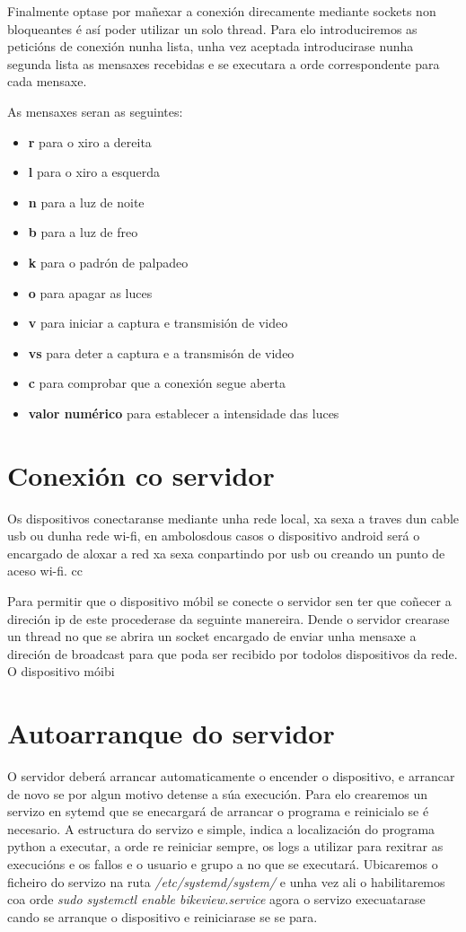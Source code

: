  Finalmente optase por mañexar a conexión direcamente mediante sockets non bloqueantes é así poder utilizar un solo thread. Para elo introduciremos as peticións de conexión nunha lista, unha vez aceptada introducirase nunha segunda lista as mensaxes recebidas e se executara a orde correspondente para cada mensaxe.

As mensaxes seran as seguintes:
\begin{itemize}
    \item \textbf{r} para o xiro a dereita
    \item \textbf{l} para o xiro a esquerda
    \item \textbf{n} para a luz de noite
    \item \textbf{b} para a luz de freo
    \item \textbf{k} para o padrón de palpadeo
    \item \textbf{o} para apagar as luces
    \item \textbf{v} para iniciar a captura e transmisión de video
    \item \textbf{vs} para deter a captura e a transmisón de video
    \item \textbf{c} para comprobar que a conexión segue aberta
    \item \textbf{valor numérico} para establecer a intensidade das luces
\end{itemize}

\section{Conexión co servidor}
Os dispositivos conectaranse mediante unha rede local, xa sexa a traves dun cable usb ou dunha rede wi-fi, en ambolosdous casos o dispositivo android será o encargado de aloxar a red xa sexa conpartindo por usb ou creando un punto de aceso wi-fi.
cc

Para permitir que o dispositivo móbil se conecte o servidor sen ter que coñecer a direción ip de este procederase da seguinte manereira. Dende o servidor crearase un thread no que se abrira un socket encargado de enviar unha mensaxe a direción de broadcast para que poda ser recibido por todolos dispositivos da rede. O dispositivo móibi

\section{Autoarranque do servidor}
O servidor deberá arrancar automaticamente o encender o dispositivo, e arrancar de novo se por algun motivo detense a súa execución. Para elo crearemos un servizo en sytemd que se enecargará de arrancar o programa e reinicialo se é necesario. A estructura do servizo e simple, indica a localización do programa python a executar, a orde re reiniciar sempre, os logs a utilizar para rexitrar as execucións e os fallos e o usuario e grupo a no que se executará. Ubicaremos o ficheiro do servizo na ruta \textit{/etc/systemd/system/} e unha vez ali o habilitaremos coa orde \textit{sudo systemctl enable bikeview.service} agora o servizo execuatarase cando se arranque o dispositivo e reiniciarase se se para.


